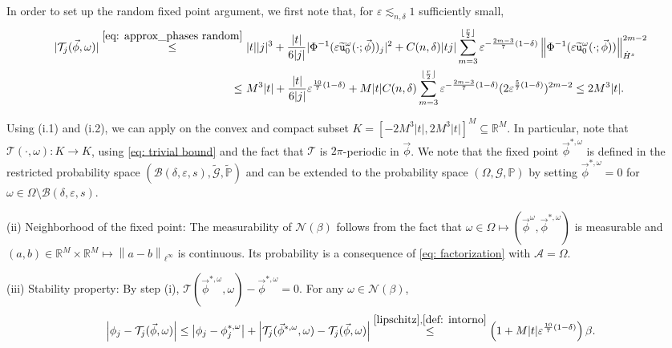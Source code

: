 \documentclass[a4paper,10pt,reqno]{article}
\theoremstyle{definition}
\theoremstyle{plain}
\theoremstyle{plain}
\theoremstyle{definition}
\theoremstyle{plain}
\theoremstyle{plain}
\theoremstyle{plain}
\theoremstyle{definition}
\theoremstyle{definition}
\newcommand{\norm}[1]{\left\lVert #1 \right\rVert}
\def \R{\mathbb R}
\def \P{{\mathbb P}}
\def \A{\mathcal{A}}
\def \tu{\mathtt{u}}
\begin{document}
\noindent In order to set up the random fixed point argument, we first note that, for $\varepsilon\lesssim_{n,\delta} 1$ sufficiently small,
\begin{equation}\label{eq: trivial bound}
\begin{split}
\lvert \mathcal{T}_j(\vec{\phi},\omega) \rvert \stackrel{\eqref{eq: approx_phases random}}{\le}&\ |t||j|^3 + \frac{|t|}{6|j|} |\Phi^{-1}(\varepsilon \widetilde{\tu}_0^{\omega}(\cdot ; \vec{\phi}))_j|^2 + C(n,\delta) |t j| \sum_{m=3}^{\lfloor \frac{r}{2} \rfloor} \varepsilon^{-\frac{2m-3}{7}(1-\delta)} \norm{\Phi^{-1}(\varepsilon \widetilde{\tu}_0^{\omega}(\cdot ; \vec{\phi}))}_{\dot{H}^s}^{2m-2} \\
\le&\ M^3 |t| + \frac{|t|}{6|j|} \varepsilon^{\frac{10}{7}(1-\delta)} + M |t| C(n,\delta) \sum_{m=3}^{\lfloor \frac{r}{2} \rfloor} \varepsilon^{-\frac{2m-3}{7}(1-\delta)} (2 \varepsilon^{\frac57(1-\delta)})^{2m-2} \le 2 M^3 |t|.
\end{split}
\end{equation}

Using (i.1) and (i.2), we can apply  on the convex and compact subset $K= [-2M^3 |t|, 2M^3 |t|]^M \subseteq \R^M$. 
In particular, note that $\mathcal{T}(\cdot,\omega) : K \longrightarrow K$, using \eqref{eq: trivial bound} and the fact that $\mathcal{T}$ is $2\pi$-periodic in $\vec{\phi}$. We note that the fixed point $\vec{\phi}^{*,\omega}$ is defined in the restricted probability space $(\mathcal{B}(\delta,\varepsilon,s), \widetilde{\mathcal{G}},\widetilde{\P})$ and can be extended to the probability space $(\mathbb{\Omega},\mathcal{G},\mathbb{P})$ by setting $\vec{\phi}^{*,\omega}=0$ for $\omega\in \mathbb{\Omega}\setminus \mathcal{B}(\delta,\varepsilon,s)$.



\medskip

\noindent (ii) {\sc Neighborhood of the fixed point:} The measurability of $\mathcal{N}(\beta)$ follows from the fact that $\omega \in \mathbb{\Omega} \mapsto (\vec{\phi}^{\omega} , \vec{\phi}^{*,\omega})$ is measurable and $(a,b) \in \R^M \times \R^M \mapsto \norm{a-b}_{\ell^{\infty}}$ is continuous. 
Its probability is a consequence of \eqref{eq: factorization} with $\A = \mathbb{\Omega}.$

\medskip

\noindent (iii) {\sc Stability property:} By step (i),
$\mathcal{T}(\vec{\phi}^{*,\omega},\omega) - \vec{\phi}^{*,\omega} = 0$. For any $\omega\in \mathcal{N}(\beta)$,
\[
\left \lvert \phi_j - \mathcal{T}_j(\vec{\phi},\omega) \right \rvert  \le \left \lvert \phi_j - \phi_j^{*,\omega} \right \rvert + \left \lvert \mathcal{T}_j(\vec{\phi}^{*,\omega},\omega) - \mathcal{T}_j(\vec{\phi},\omega) \right \rvert  \stackrel{\eqref{lipschitz},\eqref{def: intorno}}{\le} \left ( 1 + M |t| \varepsilon^{\frac{10}{7}(1-\delta)}  \right ) \beta .
\]
\end{document}
